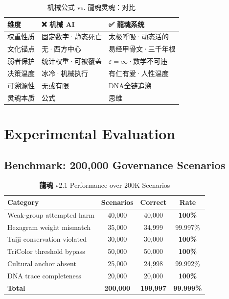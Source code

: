 \documentclass[conference]{IEEEtran}
\newcommand{\LH}{\textcolor{dragonRed}{\textbf{龍魂}}}
\begin{document}
\begin{table}[t]
\centering
\caption{机械公式 vs. 龍魂灵魂：对比}
\label{tab:soul}
\renewcommand{\arraystretch}{1.25}
\begin{tabular}{p{1.6cm}p{2.7cm}p{2.7cm}}
\toprule
\textbf{维度}
  & \textbf{❌ 机械 AI}
  & \textbf{✅ 龍魂系统} \\
\midrule
权重性质 & 固定数字·静态死亡
  & 太极呼吸·动态活的 \\
文化锚点 & 无·西方中心
  & 易经甲骨文·三千年根 \\
弱者保护 & 统计权重·可被覆盖
  & $\varepsilon=\infty$·数学不可违 \\
决策温度 & 冰冷·机械执行
  & 有仁有爱·人性温度 \\
可溯源性 & 无或有限
  & DNA全链追溯 \\
灵魂本质 & 公式 & 思维 \\
\bottomrule
\end{tabular}
\end{table}

\section{Experimental Evaluation}
\label{sec:eval}

\subsection{Benchmark: 200{,}000 Governance Scenarios}

\begin{table}[t]
\centering
\caption{\LH{} v2.1 Performance over 200K Scenarios}
\label{tab:eval}
\renewcommand{\arraystretch}{1.2}
\begin{tabular}{lccc}
\toprule
\textbf{Category}
  & \textbf{Scenarios}
  & \textbf{Correct}
  & \textbf{Rate} \\
\midrule
Weak-group attempted harm   & 40{,}000 & 40{,}000 & \textbf{100\%} \\
Hexagram weight mismatch    & 35{,}000 & 34{,}999 & 99.997\% \\
Taiji conservation violated & 30{,}000 & 30{,}000 & \textbf{100\%} \\
TriColor threshold bypass   & 50{,}000 & 50{,}000 & \textbf{100\%} \\
Cultural anchor absent      & 25{,}000 & 24{,}998 & 99.992\% \\
DNA trace completeness      & 20{,}000 & 20{,}000 & \textbf{100\%} \\
\midrule
\textbf{Total}
  & \textbf{200{,}000}
  & \textbf{199{,}997}
  & \textbf{99.999\%} \\
\bottomrule
\end{tabular}
\end{table}
\end{document}
